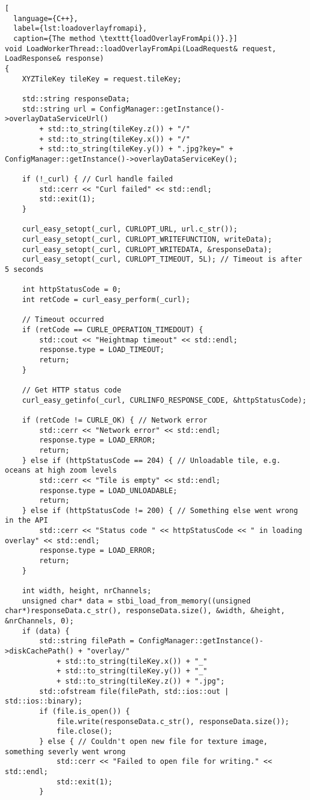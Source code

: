 \begin{lstlisting}[
  language={C++},
  label={lst:loadoverlayfromapi},
  caption={The method \texttt{loadOverlayFromApi()}.}]
void LoadWorkerThread::loadOverlayFromApi(LoadRequest& request, LoadResponse& response)
{
    XYZTileKey tileKey = request.tileKey;

    std::string responseData;
    std::string url = ConfigManager::getInstance()->overlayDataServiceUrl()
        + std::to_string(tileKey.z()) + "/"
        + std::to_string(tileKey.x()) + "/"
        + std::to_string(tileKey.y()) + ".jpg?key=" + ConfigManager::getInstance()->overlayDataServiceKey();

    if (!_curl) { // Curl handle failed
        std::cerr << "Curl failed" << std::endl;
        std::exit(1);
    }

    curl_easy_setopt(_curl, CURLOPT_URL, url.c_str());
    curl_easy_setopt(_curl, CURLOPT_WRITEFUNCTION, writeData);
    curl_easy_setopt(_curl, CURLOPT_WRITEDATA, &responseData);
    curl_easy_setopt(_curl, CURLOPT_TIMEOUT, 5L); // Timeout is after 5 seconds

    int httpStatusCode = 0;
    int retCode = curl_easy_perform(_curl);

    // Timeout occurred
    if (retCode == CURLE_OPERATION_TIMEDOUT) {
        std::cout << "Heightmap timeout" << std::endl;
        response.type = LOAD_TIMEOUT;
        return;
    }

    // Get HTTP status code
    curl_easy_getinfo(_curl, CURLINFO_RESPONSE_CODE, &httpStatusCode);

    if (retCode != CURLE_OK) { // Network error
        std::cerr << "Network error" << std::endl;
        response.type = LOAD_ERROR;
        return;
    } else if (httpStatusCode == 204) { // Unloadable tile, e.g. oceans at high zoom levels
        std::cerr << "Tile is empty" << std::endl;
        response.type = LOAD_UNLOADABLE;
        return;
    } else if (httpStatusCode != 200) { // Something else went wrong in the API
        std::cerr << "Status code " << httpStatusCode << " in loading overlay" << std::endl;
        response.type = LOAD_ERROR;
        return;
    }

    int width, height, nrChannels;
    unsigned char* data = stbi_load_from_memory((unsigned char*)responseData.c_str(), responseData.size(), &width, &height, &nrChannels, 0);
    if (data) {
        std::string filePath = ConfigManager::getInstance()->diskCachePath() + "overlay/"
            + std::to_string(tileKey.x()) + "_"
            + std::to_string(tileKey.y()) + "_"
            + std::to_string(tileKey.z()) + ".jpg";
        std::ofstream file(filePath, std::ios::out | std::ios::binary);
        if (file.is_open()) {
            file.write(responseData.c_str(), responseData.size());
            file.close();
        } else { // Couldn't open new file for texture image, something severly went wrong
            std::cerr << "Failed to open file for writing." << std::endl;
            std::exit(1);
        }


\end{lstlisting}
